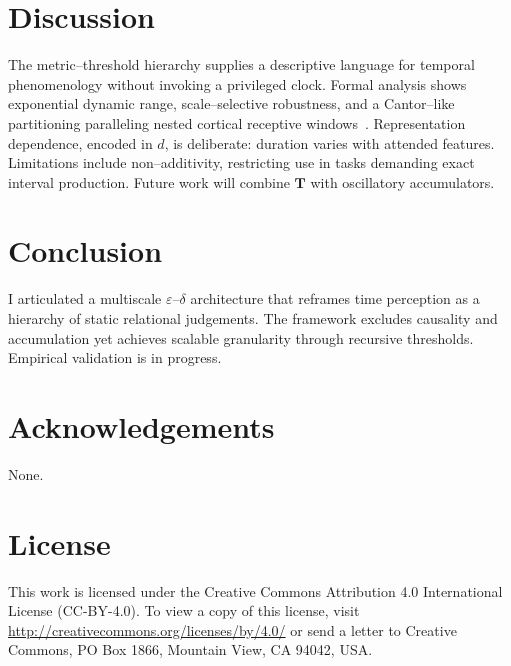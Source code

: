 \documentclass[11pt]{article}
\begin{document}
\section{Discussion}
The metric--threshold hierarchy supplies a descriptive language for
temporal phenomenology without invoking a privileged clock.  Formal
analysis shows exponential dynamic range, scale--selective robustness,
and a Cantor--like partitioning paralleling nested cortical receptive
windows~\citep{hasson2008hierarchical}.  Representation dependence,
encoded in $d$, is deliberate: duration varies with attended features.
Limitations include non--additivity, restricting use in tasks demanding
exact interval production.  Future work will combine $\mathbf T$ with
oscillatory accumulators.

\section{Conclusion}
I articulated a multiscale $\varepsilon$--$\delta$ architecture that
reframes time perception as a hierarchy of static relational
judgements.  The framework excludes causality and accumulation yet
achieves scalable granularity through recursive thresholds.
Empirical validation is in progress.

\section*{Acknowledgements}
None.

\section*{License}
This work is licensed under the Creative Commons Attribution 4.0 International License (CC-BY-4.0). To view a copy of this license, visit \url{http://creativecommons.org/licenses/by/4.0/} or send a letter to Creative Commons, PO Box 1866, Mountain View, CA 94042, USA.



\end{document}
